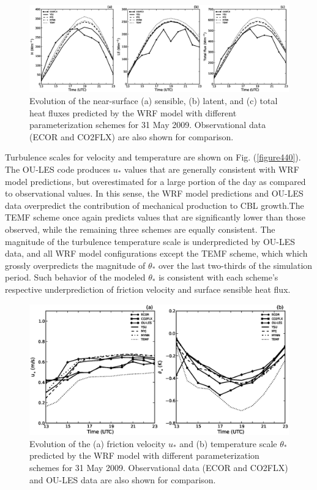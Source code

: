 \begin{figure}[ht!]
\begin{center}
\includegraphics[width=\textwidth]{figures/chapter4/shf_lhf_phys_20090531}
\end{center}
\caption{Evolution of the near-surface (a) sensible, (b) latent, and (c) total heat fluxes predicted by the WRF model with different parameterization schemes for 31 May 2009. Observational data (ECOR and CO2FLX) are also shown for comparison.}
\label{figure439}
\end{figure}


Turbulence scales for velocity and temperature are shown on Fig. (\autoref{figure440}). The OU-LES code produces $u_*$ values that are generally consistent with WRF model predictions, but overestimated for a large portion of the day as compared to observational values. In this sense, the WRF model predictions and OU-LES data overpredict the contribution of mechanical production to CBL growth.The TEMF scheme once again predicts values that are significantly lower than those observed, while the remaining three schemes are equally consistent. The magnitude of the turbulence temperature scale is underpredicted by OU-LES data, and all WRF model configurations except the TEMF scheme, which which grossly overpredicts the magnitude of $\theta_*$ over the last two-thirds of the simulation period. Such behavior of the modeled $\theta_*$ is consistent with each scheme's respective underprediction of friction velocity and surface sensible heat flux.


\begin{figure}[ht!]
\begin{center}
\includegraphics[width=\textwidth]{figures/chapter4/ust_tst_phys_20090531}
\end{center}
\caption{Evolution of the (a) friction velocity $u_*$ and (b) temperature scale $\theta_*$ predicted by the WRF model with different parameterization schemes for 31 May 2009. Observational data (ECOR and CO2FLX) and OU-LES data are also shown for comparison.}
\label{figure440}
\end{figure}


